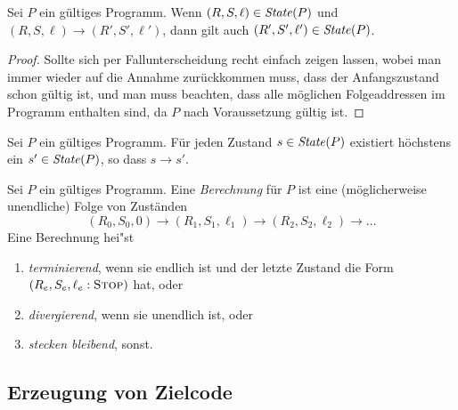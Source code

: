 \documentclass[12pt,fleqn,a4paper]{article}
\begin{document}
\begin{lemma}
  Sei $P$ ein g\"ultiges Programm. Wenn $(R,S,\ell)\in{\text{\it State\/}}(P)$ und $(R,S,\ell) \to (R',S',\ell')$, dann
  gilt auch $(R',S',\ell')\in{\text{\it State\/}}(P)$.
\end{lemma}

\begin{proof}
  Sollte sich per Fallunterscheidung recht einfach zeigen lassen, wobei man immer wieder auf die Annahme zur\"uckkommen
  muss, dass der Anfangszustand schon g\"ultig ist, und man muss beachten, dass alle m\"oglichen Folgeaddressen
  im Programm enthalten sind, da $P$ nach Voraussetzung g\"ultig ist.
\end{proof}

\begin{lemma}
  Sei $P$ ein g\"ultiges Programm. F\"ur jeden Zustand $s\in{\text{\it State\/}}(P)$ existiert h\"ochstens ein $s'\in{\text{\it State\/}}(P)$, so
  dass $s \to s'$.
\end{lemma}

\begin{definition}[Berechnung]
  Sei $P$ ein g\"ultiges Programm. Eine {\em Berechnung} f\"ur $P$ ist eine (m\"oglicherweise unendliche) Folge von
  Zust\"anden
  \[
  (R_0,S_0,0) \to (R_1,S_1,\ell_1) \to (R_2,S_2,\ell_2) \to \ldots
  \]
  Eine Berechnung hei"st
  \begin{enumerate}
    \item {\em terminierend}, wenn sie endlich ist und der letzte Zustand die Form
      $(R_e,S_e,\ell_e:\textsc{Stop})$ hat, oder
    \item {\em divergierend}, wenn sie unendlich ist, oder
    \item {\em stecken bleibend}, sonst.
  \end{enumerate}
\end{definition}


\subsection{Erzeugung von Zielcode}
\end{document}
